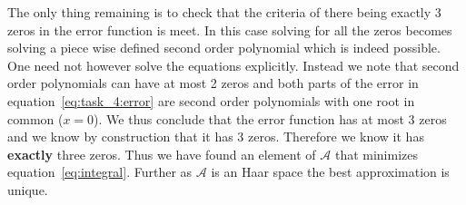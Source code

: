\begin{solution}
The only thing remaining is to check that the criteria of there being
exactly 3 zeros in the error function is meet. In this case solving
for all the zeros becomes solving a piece wise defined second order
polynomial which is indeed possible. One need not however solve the
equations explicitly. Instead we note that second order polynomials
can have at most 2 zeros and both parts of the error in
equation~\ref{eq:task_4:error} are second order polynomials with one
root in common ($x = 0$). We thus conclude that the error function has
at most 3 zeros and we know by construction that it has 3
zeros. Therefore we know it has {\bf exactly } three zeros. Thus we
have found an element of $\mathcal{A}$ that minimizes
equation~\ref{eq:integral}. Further as $\mathcal{A}$ is an Haar space
the best approximation is unique. 

    

\end{solution}


